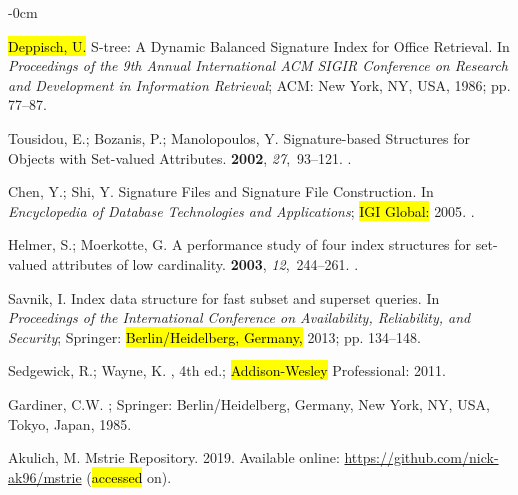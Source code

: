 \documentclass[algorithms,article,accept,pdftex,moreauthors]{Definitions/mdpi}
\begin{document}
\begin{adjustwidth}{-\extralength}{0cm}
\begin{thebibliography}{999}
\hl{Deppisch, U.} %
\newblock S-tree: A Dynamic Balanced Signature Index for Office Retrieval.
\newblock In \emph{Proceedings of the 9th Annual International ACM
  SIGIR Conference on Research and Development in Information Retrieval}; ACM:
  New York, NY, USA,  1986;  pp. 77--87.

Tousidou, E.; Bozanis, P.; Manolopoulos, Y.
\newblock Signature-based Structures for Objects with Set-valued Attributes.
 {\bf 2002}, {\em 27},~93--121.
.

Chen, Y.; Shi, Y.
\newblock Signature Files and Signature File Construction.
\newblock In {\em Encyclopedia of Database Technologies and Applications}; \hl{IGI Global: } %
 {2005}.
.

Helmer, S.; Moerkotte, G.
\newblock A performance study of four index structures for set-valued
  attributes of low cardinality.
 {\bf 2003}, {\em 12},~244--261.
.

Savnik, I.
\newblock Index data structure for fast subset and superset queries.
\newblock In \emph{Proceedings of the International Conference on Availability,
  Reliability, and Security}; Springer:  \hl{Berlin/Heidelberg, Germany,} %
  2013; pp. 134--148.

Sedgewick, R.; Wayne, K.
, 4th ed.; \hl{Addison-Wesley} %
 Professional:  2011.

Gardiner, C.W.
; Springer: Berlin/Heidelberg, Germany, New
  York, NY, USA, Tokyo, Japan, 1985.

Akulich, M.
\newblock Mstrie Repository. 2019. Available online:  \url{https://github.com/nick-ak96/mstrie} (\hl{accessed} %
 on).


\end{thebibliography}
\end{adjustwidth}
\end{document}

